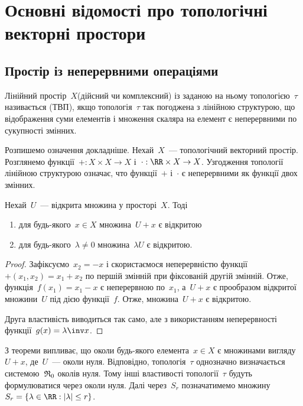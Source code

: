 \newcommand{\AdditionFunction}{+}
\newcommand{\MultiplicationFunction}{\cdot}

\chapter{Основні відомості про топологічні векторні простори}

\section{Простір із неперервними операціями}

\begin{definition}
    Лінійний простір~$X$(дійсний чи комплексний) із заданою на ньому топологією~$\tau$ називається (ТВП), якщо топологія~$\tau$ так погоджена з лінійною структурою, що відображення суми елементів і множення скаляра на елемент є неперервними по сукупності змінних.
\end{definition}

Розпишемо означення докладніше. Нехай~$X$~--- топологічний векторний простір. Розглянемо функції~$\AdditionFunction: X \times X \to X$ і~$\MultiplicationFunction: \RR \times X \to X$. Узгодження топології лінійною структурою означає, что функції~$+$ і~$\cdot$ є неперервними як функції двох змінних.

\begin{theorem}
    Нехай~$U$~--- відкрита множина у просторі~$X$. Тоді
    \begin{enumerate}
        \item для будь-якого~$x \in X$ множина~$U + x$ є відкритою
        \item для будь-якого~$\lambda \ne 0$ множина~$\lambda U$ є відкритою.
    \end{enumerate}
\end{theorem}

\begin{proof}
    Зафіксуємо~$x_2 = -x$ і скористаємося неперервністю функції~$\AdditionFunction(x_1, x_2) = x_1 + x_2$ по першій змінній при фіксованій другій змінній. Отже, функція~$f(x_1) = x_1 - x$ є неперервною по~$x_1$, а~$U + x$ є прообразом відкритої множини~$U$ під дією функції~$f$. Отже, множина~$U + x$ є відкритою.

    Друга властивість виводиться так само, але з використанням неперервності функції~$g(x) = \lambda\inv x$.
\end{proof}

З теореми випливає, що околи будь-якого елемента~$x \in X$ є множинами вигляду~$U + x$, де~$U$~--- околи нуля. Відповідно, топологія~$\tau$ однозначно визначається системою~$\frak R_0$ околів нуля. Тому інші властивості топології~$\tau$ будуть формулюватися через околи нуля. Далі через~$S_r$ позначатимемо множину~$S_r = \{\lambda \in \RR: |\lambda| \le r\}$.

